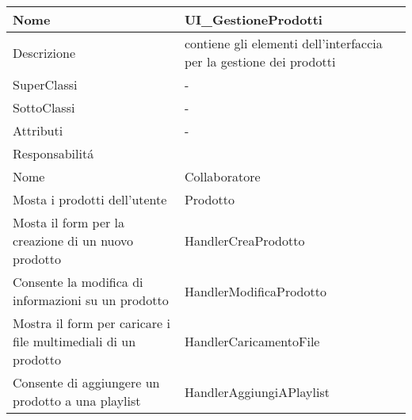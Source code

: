 \begin{center} %
    \begin{longtable}{ |p{3cm}|p{3cm}|p{3cm}|p{3cm}| }
        \hline
        Nome & \multicolumn{3}{|p{9cm}|}{UI\_GestioneProdotti} \\\hline
        Descrizione & \multicolumn{3}{|p{9cm}|}{contiene gli elementi dell'interfaccia per la gestione dei prodotti} \\\hline
        SuperClassi & \multicolumn{3}{|p{9cm}|}{-} \\\hline
        SottoClassi & \multicolumn{3}{|p{9cm}|}{-} \\\hline
        Attributi & \multicolumn{3}{|p{9cm}|}{-} \\\hline
        \multicolumn{4}{|p{12cm}|}{Responsabilit\'a} \\\hline %
        \multicolumn{2}{|p{6cm}|}{Nome} & \multicolumn{2}{|p{6cm}|}{Collaboratore} \\\hline
        \multicolumn{2}{|p{6cm}|}{Mosta i prodotti dell'utente} & \multicolumn{2}{|p{6cm}|}{Prodotto} \\\hline
        \multicolumn{2}{|p{6cm}|}{Mosta il form per la creazione di un nuovo prodotto} & \multicolumn{2}{|p{6cm}|}{HandlerCreaProdotto} \\\hline
        \multicolumn{2}{|p{6cm}|}{Consente la modifica di informazioni su un prodotto} & \multicolumn{2}{|p{6cm}|}{HandlerModificaProdotto} \\\hline
        \multicolumn{2}{|p{6cm}|}{Mostra il form per caricare i file multimediali di un prodotto} & \multicolumn{2}{|p{6cm}|}{HandlerCaricamentoFile} \\\hline
        \multicolumn{2}{|p{6cm}|}{Consente di aggiungere un prodotto a una playlist} & \multicolumn{2}{|p{6cm}|}{HandlerAggiungiAPlaylist} \\\hline
    \end{longtable}
\end{center}


